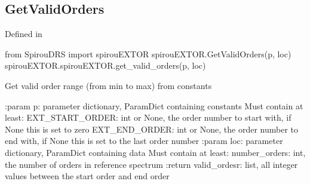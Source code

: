 
\noindent\begin{minipage}{\textwidth}
\subsection{GetValidOrders}

Defined in \spirouEXTOR{}
\begin{pythonbox}
from SpirouDRS import spirouEXTOR
spirouEXTOR.GetValidOrders(p, loc)
spirouEXTOR.spirouEXTOR.get_valid_orders(p, loc)
\end{pythonbox}

\begin{pythondocstring}
Get valid order range (from min to max) from constants

:param p: parameter dictionary, ParamDict containing constants
    Must contain at least:
        EXT_START_ORDER: int or None, the order number to start with, if
                         None this is set to zero
        EXT_END_ORDER: int or None, the order number to end with, if None
                       this is set to the last order number
:param loc: parameter dictionary, ParamDict containing data
        Must contain at least:
            number_orders: int, the number of orders in reference spectrum
:return valid_ordesr: list, all integer values between the start order and
                      end order
\end{pythondocstring}
\end{minipage}



